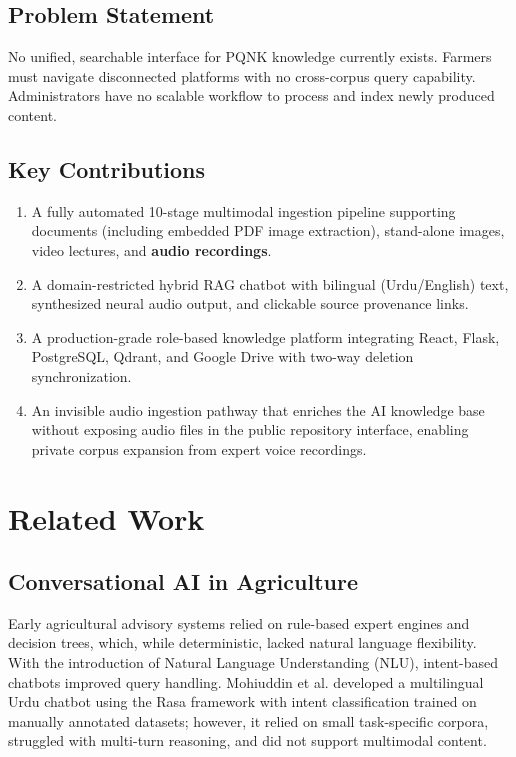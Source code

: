 \documentclass[conference]{IEEEtran}
\begin{document}
\subsection*{Problem Statement}
No unified, searchable interface for PQNK knowledge currently exists. Farmers must navigate
disconnected platforms with no cross-corpus query capability. Administrators have no
scalable workflow to process and index newly produced content.

\subsection*{Key Contributions}
\begin{enumerate}[noitemsep, leftmargin=*]
  \item A fully automated 10-stage multimodal ingestion pipeline supporting documents
        (including embedded PDF image extraction), stand-alone images, video lectures,
        and \textbf{audio recordings}.
  \item A domain-restricted hybrid RAG chatbot with bilingual (Urdu/English) text,
        synthesized neural audio output, and clickable source provenance links.
  \item A production-grade role-based knowledge platform integrating React, Flask,
        PostgreSQL, Qdrant, and Google Drive with two-way deletion synchronization.
  \item An invisible audio ingestion pathway that enriches the AI knowledge base without
        exposing audio files in the public repository interface, enabling private corpus
        expansion from expert voice recordings.
\end{enumerate}

\section{Related Work}

\subsection{Conversational AI in Agriculture}
Early agricultural advisory systems relied on rule-based expert engines and decision trees,
which, while deterministic, lacked natural language flexibility. With the introduction of
Natural Language Understanding (NLU), intent-based chatbots improved query handling.
Mohiuddin et al. \cite{mohiuddin2022} developed a multilingual Urdu chatbot using the Rasa
framework with intent classification trained on manually annotated datasets; however, it
relied on small task-specific corpora, struggled with multi-turn reasoning, and did not
support multimodal content.
\end{document}

